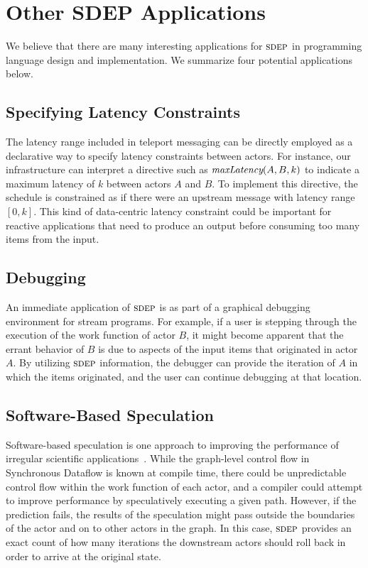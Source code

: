 \section{Other SDEP Applications}
\label{sec:others-apps}

We believe that there are many interesting applications for $\textsc{sdep}$ in
programming language design and implementation.  We summarize four
potential applications below.

\subsection{Specifying Latency Constraints}

The latency range included in teleport messaging can be directly
employed as a declarative way to specify latency constraints between
actors.  For instance, our infrastructure can interpret a directive
such as $\mbox{\it maxLatency}(A, B, k)$ to indicate a maximum latency of
$k$ between actors $A$ and $B$.  To implement this directive, the
schedule is constrained as if there were an upstream message with
latency range $[0,k]$.  This kind of data-centric latency constraint
could be important for reactive applications that need to produce an
output before consuming too many items from the input.

\subsection{Debugging}

An immediate application of $\textsc{sdep}$ is as part of a graphical
debugging environment for stream programs.  For example, if a user is
stepping through the execution of the work function of actor $B$, it
might become apparent that the errant behavior of $B$ is due to
aspects of the input items that originated in actor $A$.  By utilizing
$\textsc{sdep}$ information, the debugger can provide the iteration of $A$ in
which the items originated, and the user can continue debugging at
that location.

\subsection{Software-Based Speculation}

Software-based speculation is one approach to improving the
performance of irregular scientific applications~\cite{frank-thesis}.
While the graph-level control flow in Synchronous Dataflow is known at
compile time, there could be unpredictable control flow within the
work function of each actor, and a compiler could attempt to improve
performance by speculatively executing a given path.  However, if the
prediction fails, the results of the speculation might pass outside
the boundaries of the actor and on to other actors in the graph.  In
this case, $\textsc{sdep}$ provides an exact count of how many iterations the
downstream actors should roll back in order to arrive at the original
state.

